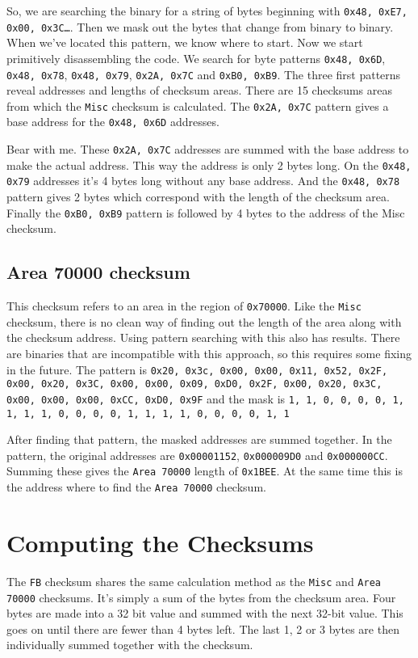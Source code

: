 \documentclass[11pt,a4paper]{book}
\begin{document}
So, we are searching the binary for a string of bytes beginning with
\texttt{0x48, 0xE7, 0x00, 0x3C\ldots}. Then we mask out the bytes that change
from binary to binary. When we've located this pattern, we know where to start.
Now we start primitively disassembling the code. We search for byte patterns
\texttt{0x48, 0x6D}, \texttt{0x48, 0x78}, \texttt{0x48, 0x79}, \texttt{0x2A,
0x7C} and \texttt{0xB0, 0xB9}. The three first patterns reveal addresses and
lengths of checksum areas. There are 15 checksums areas from which the
\texttt{Misc} checksum is calculated. The \texttt{0x2A, 0x7C} pattern gives a
base address for the \texttt{0x48, 0x6D} addresses.

Bear with me. These \texttt{0x2A, 0x7C} addresses are summed with the base
address to make the actual address. This way the address is only 2 bytes long.
On the \texttt{0x48, 0x79} addresses it's 4 bytes long without any base address.
And the \texttt{0x48, 0x78} pattern gives 2 bytes which correspond with the
length of the checksum area. Finally the \texttt{0xB0, 0xB9} pattern is followed
by 4 bytes to the address of the Misc checksum.

\subsection{Area 70000 checksum}
This checksum refers to an area in the region of
\texttt{0x70000}. Like the \texttt{Misc} checksum, there is no clean way of
finding out the length of the area along with the checksum address. Using
pattern searching with this also has results. There are binaries that are
incompatible with this approach, so this requires some fixing in the future. The
pattern is \texttt{0x20, 0x3c, 0x00, 0x00, 0x11, 0x52, 0x2F, 0x00, 0x20, 0x3C,
    0x00, 0x00, 0x09, 0xD0, 0x2F, 0x00, 0x20, 0x3C, 0x00, 0x00, 0x00, 0xCC,
0xD0, 0x9F} and the mask is \texttt{1, 1, 0, 0, 0, 0, 1, 1, 1, 1, 0, 0, 0, 0, 1,
1, 1, 1, 0, 0, 0, 0, 1, 1}

After finding that pattern, the masked addresses are summed together. In the
pattern, the original addresses are \texttt{0x00001152}, \texttt{0x000009D0} and
\texttt{0x000000CC}. Summing these gives the \texttt{Area 70000} length of
\texttt{0x1BEE}. At the same time this is the address where to find the \texttt{Area
70000} checksum.

\section{Computing the Checksums}
The \texttt{FB} checksum shares the same calculation method as the \texttt{Misc}
and \texttt{Area 70000} checksums. It's simply a sum of the bytes from the
checksum area. Four bytes are made into a 32 bit value and summed with the next
32-bit value. This goes on until there are fewer than 4 bytes left. The last 1,
2 or 3 bytes are then individually summed together with the checksum.
\end{document}
